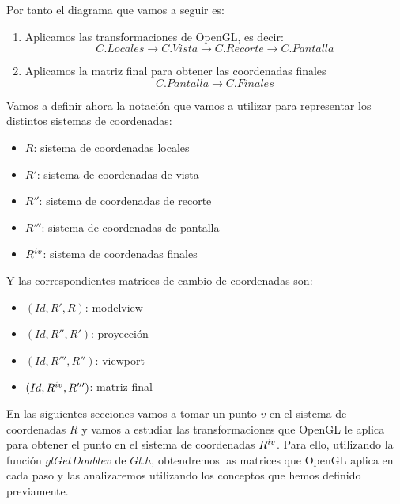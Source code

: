 \documentclass[a4paper,11pt, oneside]{book}
\begin{document}
Por tanto el diagrama que vamos a seguir es:

\begin{enumerate}
	\item Aplicamos las transformaciones de OpenGL, es decir:
	\begin{equation}
	C. Locales \rightarrow C. Vista \rightarrow C.Recorte \rightarrow C.Pantalla
	\end{equation}
	\item Aplicamos la matriz final para obtener las coordenadas finales
	\begin{equation}
		C.Pantalla \rightarrow C.Finales
	\end{equation}
\end{enumerate}


Vamos a definir ahora la notación que vamos a utilizar para representar los distintos sistemas de coordenadas:

\begin{itemize}
	\item $R$: sistema de coordenadas locales
	\item $R'$: sistema de coordenadas de vista
	\item $R''$: sistema de coordenadas de recorte
	\item $R'''$: sistema de coordenadas de pantalla
	\item $R^{\romannumeral 4}$: sistema de coordenadas finales
\end{itemize}

Y las correspondientes matrices de cambio de coordenadas son:

\begin{itemize}
	\item $(Id, R', R)$: modelview
	\item $(Id, R'', R')$: proyección
	\item $(Id, R''', R'')$: viewport
	\item $(Id, R^{\romannumeral 4}, R''')$: matriz final
\end{itemize}

En las siguientes secciones vamos a tomar un punto $v$ en el sistema de coordenadas $R$ y vamos a estudiar las transformaciones que OpenGL le aplica para obtener el punto en el sistema de coordenadas $R^{\romannumeral 4}$. Para ello, utilizando la función $glGetDoublev$ de $Gl.h$, obtendremos las matrices que OpenGL aplica en cada paso y las analizaremos utilizando los conceptos que hemos definido previamente.

\end{document}
